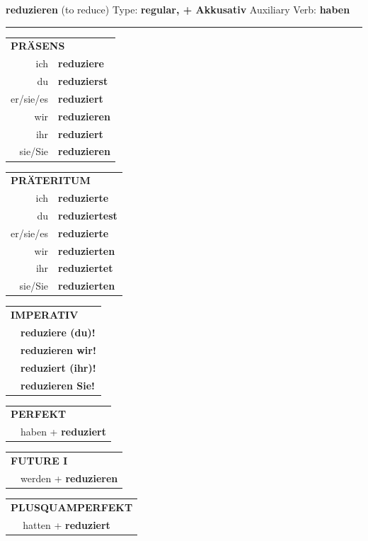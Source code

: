 \documentclass[10pt,a4paper]{revtex4-2}
\begin{document}
\begin{verbbox-acc}
{\Large \bf reduzieren} (to reduce) \hfill Type: \textbf{regular, + Akkusativ} \hfill Auxiliary Verb: \textbf{haben}

\vspace{5pt}
\hrule
\vspace{5pt}

\begin{tabular}{rl}
\multicolumn{2}{l}{\textbf{PRÄSENS}}\\
ich & \textbf{reduziere}\\
du & \textbf{reduzierst}\\
er/sie/es & \textbf{reduziert}\\
wir & \textbf{reduzieren}\\
ihr & \textbf{reduziert}\\
sie/Sie & \textbf{reduzieren}\\
\end{tabular}
\hfill
\begin{tabular}{rl}
\multicolumn{2}{l}{\textbf{PRÄTERITUM}}\\
ich & \textbf{reduzierte}\\
du & \textbf{reduziertest}\\
er/sie/es & \textbf{reduzierte}\\
wir & \textbf{reduzierten}\\
ihr & \textbf{reduziertet}\\
sie/Sie & \textbf{reduzierten}\\
\end{tabular}
\hfill
\begin{tabular}{rl}
\multicolumn{2}{l}{\textbf{IMPERATIV}}\\
& \textbf{reduziere (du)!}\\
& \textbf{reduzieren wir!}\\
& \textbf{reduziert (ihr)!}\\
& \textbf{reduzieren Sie!}\\
\end{tabular}

\vspace{10pt}

\begin{tabular}{rl}
\multicolumn{2}{l}{\textbf{PERFEKT}}\\
& haben + \textbf{reduziert}\\
\end{tabular}
\hfill
\begin{tabular}{rl}
\multicolumn{2}{l}{\textbf{FUTURE I}}\\
& werden + \textbf{reduzieren}\\
\end{tabular}
\hfill
\begin{tabular}{rl}
\multicolumn{2}{l}{\textbf{PLUSQUAMPERFEKT}}\\
& hatten + \textbf{reduziert}\\
\end{tabular}


\end{verbbox-acc}
\end{document}
